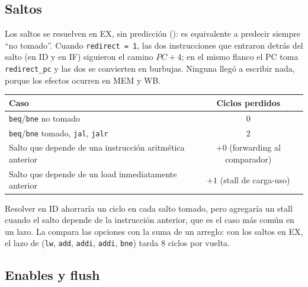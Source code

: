 
\subsection{Saltos}

Los saltos se resuelven en EX, sin predicción (): es equivalente a predecir siempre
``no tomado''. Cuando \texttt{redirect = 1}, las dos instrucciones que entraron detrás del salto
(en ID y en IF) siguieron el camino $PC + 4$; en el mismo flanco el PC toma
\texttt{redirect\_pc} y las dos se convierten en burbujas. Ninguna llegó a escribir nada, porque
los efectos ocurren en MEM y WB.

\begin{center}
\small
\begin{tabular}{@{}l c@{}}
  \toprule
  \textbf{Caso} & \textbf{Ciclos perdidos} \\
  \midrule
  \texttt{beq}/\texttt{bne} no tomado & 0 \\
  \texttt{beq}/\texttt{bne} tomado, \texttt{jal}, \texttt{jalr} & 2 \\
  Salto que depende de una instrucción aritmética anterior & $+0$ (forwarding al comparador) \\
  Salto que depende de un load inmediatamente anterior & $+1$ (stall de carga-uso) \\
  \bottomrule
\end{tabular}
\end{center}

Resolver en ID ahorraría un ciclo en cada salto tomado, pero agregaría un stall cuando el salto
depende de la instrucción anterior, que es el caso más común en un lazo. La  compara
las opciones con la suma de un arreglo: con los saltos en EX, el lazo de 
(\texttt{lw}, \texttt{add}, \texttt{addi}, \texttt{addi}, \texttt{bne}) tarda 8 ciclos por vuelta.


\subsection{Enables y flush}

